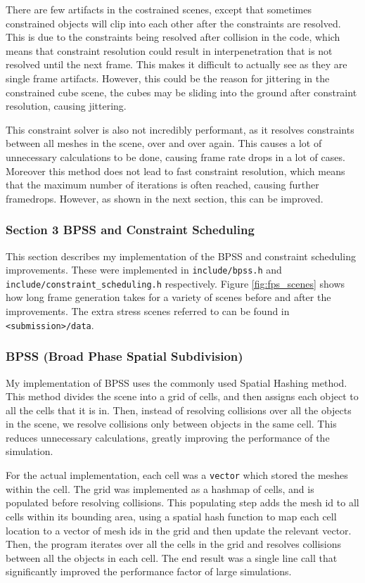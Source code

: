 \documentclass[11pt,a4paper]{article}
\begin{document}
There are few artifacts in the costrained scenes, except that sometimes constrained objects will clip into each other after the constraints are resolved. 
This is due to the constraints being resolved after collision in the code, which means that constraint resolution could result in interpenetration that is not resolved until the next frame. 
This makes it difficult to actually see as they are single frame artifacts. 
However, this could be the reason for jittering in the constrained cube scene, the cubes may be sliding into the ground after constraint resolution, causing jittering.

This constraint solver is also not incredibly performant, as it resolves constraints between all meshes in the scene, over and over again. 
This causes a lot of unnecessary calculations to be done, causing frame rate drops in a lot of cases. 
Moreover this method does not lead to fast constraint resolution, which means that the maximum number of iterations is often reached, causing further framedrops. 
However, as shown in the next section, this can be improved. 

\subsubsection*{Section 3 BPSS and Constraint Scheduling}
This section describes my implementation of the BPSS and constraint scheduling improvements.
These were implemented in \texttt{include/bpss.h} and \texttt{include/constraint\_scheduling.h} respectively. 
Figure \ref{fig:fps_scenes} shows how long frame generation takes for a variety of scenes before and after the improvements.
The extra stress scenes referred to can be found in \texttt{<submission>/data}. 

\subsubsection*{BPSS (Broad Phase Spatial Subdivision)}

My implementation of BPSS uses the commonly used Spatial Hashing method. 
This method divides the scene into a grid of cells, and then assigns each object to all the cells that it is in. 
Then, instead of resolving collisions over all the objects in the scene, we resolve collisions only between objects in the same cell.
This reduces unnecessary calculations, greatly improving the performance of the simulation. 

For the actual implementation, each cell was a \texttt{vector} which stored the meshes within the cell. 
The grid was implemented as a hashmap of cells, and is populated before resolving collisions. 
This populating step adds the mesh id to all cells within its bounding area, using a spatial hash function to map each cell location to a vector of mesh ids in the grid and then update the relevant vector.
Then, the program iterates over all the cells in the grid and resolves collisions between all the objects in each cell.
The end result was a single line call that significantly improved the performance factor of large simulations. 
\end{document}
